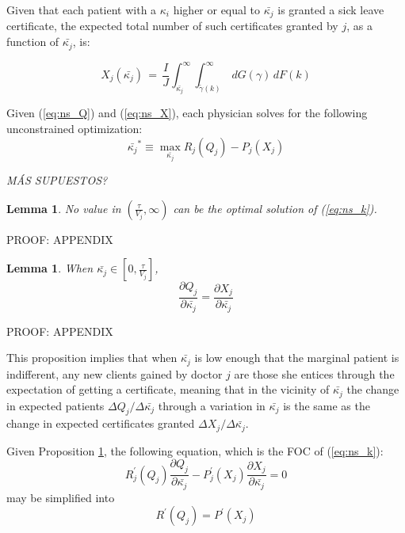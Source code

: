 \documentclass{article}
\newtheorem{lemma}[theorem]{Lemma}
\begin{document}
Given that each patient with a $\kappa_i$ higher or equal to $\bar{\kappa_j}$ is granted a sick leave certificate, the expected total number of such certificates granted by $j$, as a function of $\bar{\kappa_j}$, is:

\begin{equation}
    X_j(\bar{\kappa_j}) \,=\, \frac{I}{J} \int_{\bar{\kappa_j}}^{\infty} \int_{\tilde{\gamma}(k)}^{\infty} \,dG(\gamma) \,dF(k)
    \tag{N.2}\label{eq:ns_X}
\end{equation}

Given (\ref{eq:ns_Q}) and (\ref{eq:ns_X}), each physician solves for the following unconstrained optimization:
\begin{equation}
\bar{\kappa_j}^* \equiv \max_{\bar{\kappa_j}} R_j(Q_j) - P_j(X_j)
\tag{N.3}\label{eq:ns_k}
\end{equation}

\textit{MÁS SUPUESTOS?}

\begin{lemma}
\label{ns_lemma}
No value in $(\frac{\tau}{V_j},\infty)$ can be the optimal solution of (\ref{eq:ns_k}).
\end{lemma}

PROOF: APPENDIX

\begin{lemma}
    \label{ns_derivatives}
When $\bar{\kappa_j} \in [0,\frac{\tau}{V_j}]$,
\[
    \frac{\partial Q_j}{\partial\bar{\kappa_j}} = \frac{\partial X_j}{\partial \bar{\kappa_j}}   
\]
\end{lemma}

PROOF: APPENDIX

This proposition implies that when $\bar{\kappa_j}$ is low enough that the marginal patient is indifferent, any new clients gained by doctor $j$ are those she entices through the expectation of getting a certificate, meaning that in the vicinity of $\bar{\kappa_j}$ the change in expected patients $\Delta Q_j/\Delta\bar{\kappa_j}$ through a variation in $\bar{\kappa_j}$ is the same as the change in expected certificates granted $\Delta X_j/\Delta \bar{\kappa_j}$.

Given Proposition \ref{ns_derivatives}, the following equation, which is the FOC of (\ref{eq:ns_k}):
\[
R_j^{\prime}(Q_j)\frac{\partial Q_j}{\partial\bar{\kappa_j}}  - P_j^{\prime}(X_j)\frac{\partial X_j}{\partial \bar{\kappa_j}} = 0
\]
may be simplified into
\begin{equation}
    R^{\prime}(Q_j) = P^{\prime}(X_j)
    \tag{N.4}\label{eq:ns_FOC}
\end{equation}
\end{document}
